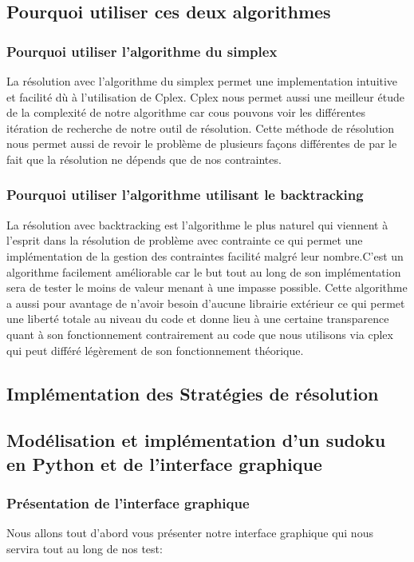 \subsection{Pourquoi utiliser ces deux algorithmes}

\subsubsection{Pourquoi utiliser l'algorithme du simplex}

La résolution avec l'algorithme du simplex permet une implementation intuitive et facilité dù à l'utilisation de Cplex. Cplex nous permet aussi une meilleur étude de la complexité de notre algorithme car cous pouvons voir les différentes itération de recherche de notre outil de résolution. Cette méthode de résolution nous permet aussi de revoir le problème de plusieurs façons différentes de par le fait que la résolution ne dépends que de nos contraintes.

\subsubsection{Pourquoi utiliser l'algorithme utilisant le backtracking}

La résolution avec backtracking est l'algorithme le plus naturel qui viennent à l'esprit dans la résolution de problème avec contrainte ce qui permet une implémentation de la gestion des contraintes facilité malgré leur nombre.C'est un algorithme facilement améliorable car le but tout au long de son implémentation sera de tester le moins de valeur menant à une impasse possible. Cette algorithme a aussi pour avantage de n'avoir besoin d'aucune librairie extérieur ce qui permet une liberté totale au niveau du code et donne lieu à une certaine transparence quant à son fonctionnement contrairement au code que nous utilisons via cplex qui peut différé légèrement de son fonctionnement théorique.\newpage

\subsection{Implémentation des Stratégies de résolution}

\subsection{Modélisation et implémentation d'un sudoku en Python et de l'interface graphique}

\subsubsection{Présentation de l'interface graphique}
Nous allons tout d'abord vous présenter notre interface graphique qui nous servira tout au long de nos test:\newline

